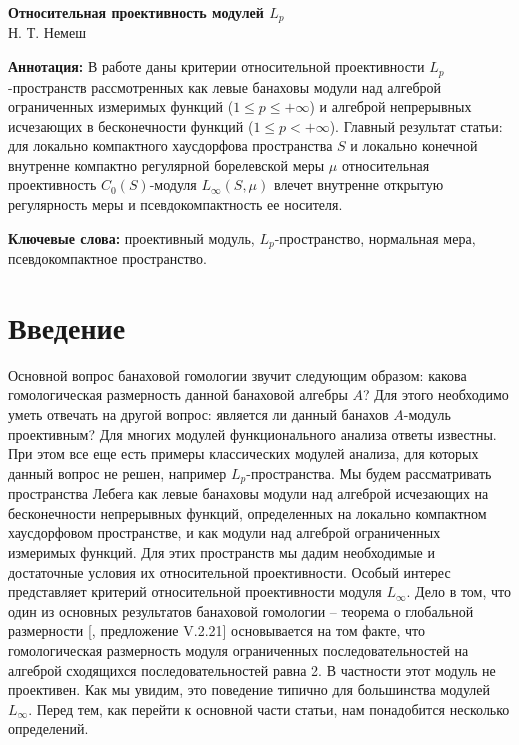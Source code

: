 \documentclass[12pt]{article}
\begin{document}
\begin{center}
    \Large \textbf{Относительная проективность модулей $L_p$}\\[0.5cm]
    \small {Н. Т. Немеш}
\end{center}

\thispagestyle{empty}

\medskip
\textbf{Аннотация:} В работе даны критерии относительной проективности $L_p$-пространств рассмотренных как левые банаховы модули над алгеброй ограниченных измеримых функций ($1\leq p\leq+\infty$) и алгеброй непрерывных исчезающих в бесконечности функций ($1\leq p <+\infty$). Главный результат статьи: для локально компактного хаусдорфова пространства $S$ и локально конечной внутренне компактно регулярной борелевской меры $\mu$ относительная проективность $C_0(S)$-модуля $L_\infty(S,\mu)$ влечет внутренне открытую регулярность меры и псевдокомпактность ее носителя.

\medskip
\textbf{Ключевые слова:} проективный модуль, $L_p$-пространство, нормальная мера, псевдокомпактное пространство.

\bigskip


\section{Введение}
\label{SectionIntroduction}

Основной вопрос банаховой гомологии звучит следующим образом: какова гомологическая размерность данной банаховой алгебры $A$? Для этого необходимо уметь отвечать на другой вопрос: является ли данный банахов $A$-модуль проективным? Для многих модулей функционального анализа ответы известны. При этом все еще есть примеры классических модулей анализа, для которых данный вопрос не решен, например $L_p$-пространства. Мы будем рассматривать пространства Лебега как левые банаховы модули над алгеброй исчезающих на бесконечности непрерывных функций, определенных на локально компактном хаусдорфовом пространстве, и как модули над алгеброй ограниченных измеримых функций. Для этих пространств мы дадим необходимые и достаточные условия их относительной проективности. Особый интерес представляет критерий относительной проективности модуля $L_\infty$. Дело в том, что один из основных результатов банаховой гомологии -- теорема о глобальной размерности [\cite{HelHomolBanTopAlg}, предложение V.2.21] основывается на том факте, что гомологическая размерность модуля ограниченных последовательностей на алгеброй сходящихся последовательностей равна 2. В частности этот модуль не проективен. Как мы увидим, это поведение типично для большинства модулей $L_\infty$. Перед тем, как перейти к основной части статьи, нам понадобится несколько определений.
\end{document}

